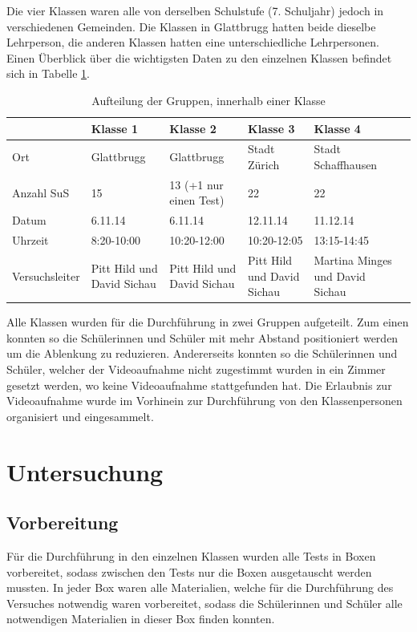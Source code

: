 Die vier Klassen waren alle von derselben Schulstufe (7. Schuljahr) jedoch in verschiedenen Gemeinden. Die Klassen in Glattbrugg hatten beide dieselbe Lehrperson, die anderen Klassen hatten eine unterschiedliche Lehrpersonen. Einen Überblick über die wichtigsten Daten zu den einzelnen Klassen befindet sich in Tabelle \ref{tab:Klassen}. 


\begin{table}[htbp]
  \centering
  \begin{tabular}{@{}lp{2.3cm}p{3cm}p{3cm}p{3cm}p{3cm}@{}}
  \toprule
   & Klasse 1 & Klasse 2 & Klasse 3 & Klasse 4 \\ 
  \midrule
   Ort & Glattbrugg & Glattbrugg & Stadt Zürich & Stadt Schaffhausen \\ [0.2cm]
   Anzahl SuS & 15 & 13 (+1 nur einen Test) & 22 & 22 \\ [0.2cm]
   Datum  & 6.11.14 & 6.11.14 & 12.11.14 & 11.12.14\\ [0.3cm]
   Uhrzeit & 8:20-10:00 & 10:20-12:00& 10:20-12:05 & 13:15-14:45 \\ [0.3cm]
   Versuchsleiter & Pitt Hild und David Sichau   & Pitt Hild und David Sichau  & Pitt Hild und David Sichau  & Martina Minges und David Sichau \\
  \bottomrule
  \end{tabular} 
  \caption{Aufteilung der Gruppen, innerhalb einer Klasse}
  \label{tab:Klassen}
\end{table}

Alle Klassen wurden für die Durchführung in zwei Gruppen aufgeteilt. Zum einen konnten so die Schülerinnen und Schüler mit mehr Abstand positioniert werden um die Ablenkung zu reduzieren. Andererseits konnten so die Schülerinnen und Schüler, welcher der Videoaufnahme nicht zugestimmt wurden in ein Zimmer gesetzt werden, wo keine Videoaufnahme stattgefunden hat. Die Erlaubnis zur Videoaufnahme wurde im Vorhinein zur Durchführung von den Klassenpersonen organisiert und eingesammelt.



\section{Untersuchung}

\subsection{Vorbereitung}
Für die Durchführung in den einzelnen Klassen wurden alle Tests in Boxen vorbereitet, sodass zwischen den Tests nur die Boxen ausgetauscht werden mussten. In jeder Box waren alle Materialien, welche für die Durchführung des Versuches notwendig waren vorbereitet, sodass die Schülerinnen und Schüler alle notwendigen Materialien in dieser Box finden konnten.  

